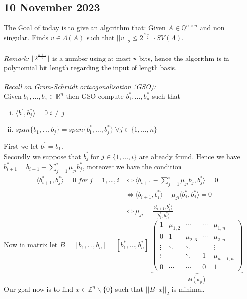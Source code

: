 \documentclass[a4paper,11pt,american]{article}
\newcommand{\Q}{\mathbb{Q}}
\newcommand{\R}{\mathbb{R}}
\newcommand{\Z}{\mathbb{Z}}
\theoremstyle{plain}
\theoremstyle{definition}
\begin{document}
\subsection*{10 November 2023}
The Goal of today is to give an algorithm that: Given $A\in \Q^{n\times n}$ and non singular. Finds $v\in \Lambda(A)$ such that $\vert\vert v\vert\vert_2\leq 2^{\frac{n-1}{2}}\cdot SV(\Lambda)$.\\\\
\emph{Remark:} $\lfloor2^{\frac{n+1}{2}}\rfloor$ is a number using at most $n$ bits, hence the algorithm is in polynomial bit length regarding the input of length basis.\\\\
\emph{Recall on Gram-Schmidt orthogonalisation (GSO):}\\
Given $b_1,\dots,b_n\in \R^n$ then GSO compute $b_1^*,\dots,b_n^*$ such that \begin{enumerate}[i)]
    \item $\langle b_i^*,b_j^*\rangle=0 \; i\neq j$
    \item $ span \{b_1,\dots,b_j\}=span\{b_1^*,\dots,b_j^*\}\; \forall j\in\{1,\dots,n\}$
\end{enumerate}
First we let $b_1^*=b_1$.\\
Secondly we suppose that $b_j^^*$ for $j\in\{1,\dots,i\}$ are already found. Hence we have $b_{i+1}^*=b_{i+1}-\sum_{j=1}^i\mu_{ji}b_j^*$, moreover we have the condition \begin{align*}
    \langle b_{i+1}^*,b^*_j\rangle=0 \; for\; j=1,\dots,i&\iff \langle b_{i+1}-\sum_{j=1}^i\mu_{ji}b_j,b_j^*\rangle=0\\
    &\iff \langle b_{i+1},b_j^*\rangle-\mu_{ji}\langle b_j^*,b_j^*\rangle=0\\
    &\iff \mu_{ji}=\frac{\langle b_{i+1},b_j^*\rangle}{\langle b_j^*,b_j^*\rangle}
\end{align*}
Now in matrix let $B=[b_1,\dots,b_n]=[b_1^*,\dots,b_n^*]$
$\underbrace{\begin{pmatrix}
    1 & \mu_{1,2} & \cdots & \cdots & \mu_{1,n} \\
    0 & 1 & \mu_{2,3} & \cdots & \mu_{2,n} \\
    \vdots & \ddots & \ddots & &  \vdots \\
     \vdots & & \ddots& 1 & \mu_{n-1, n} \\
    0 & \cdots & \cdots & 0 & 1
\end{pmatrix}}_{M(\mu_{ji})}$\\
Our goal now is to find $x\in\Z^n\backslash\{0\}$ such that $\vert\vert B\cdot x\vert\vert_2$ is minimal.\\
\end{document}
